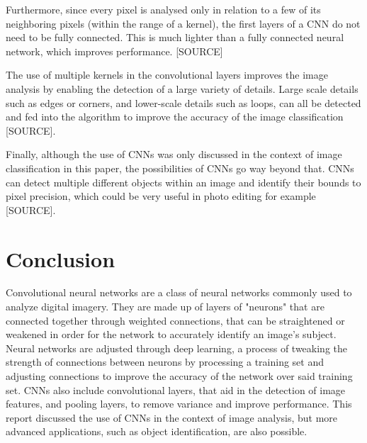 \documentclass[12pt,a4paper,notitlepage]{article}
\begin{document}
Furthermore, since every pixel is analysed only in relation to a few of its neighboring pixels (within the range of a kernel), the first layers of a CNN do not need to be fully connected. This is much lighter than a fully connected neural network, which improves performance. [SOURCE]

The use of multiple kernels in the convolutional layers improves the image analysis by enabling the detection of a large variety of details. Large scale details such as edges or corners, and lower-scale details such as loops, can all be detected and fed into the algorithm to improve the accuracy of the image classification [SOURCE].

Finally, although the use of CNNs was only discussed in the context of image classification in this paper, the possibilities of CNNs go way beyond that. CNNs can detect multiple different objects within an image and identify their bounds to pixel precision, which could be very useful in photo editing for example [SOURCE].

\section{Conclusion}
Convolutional neural networks are a class of neural networks commonly used to analyze digital imagery. They are made up of layers of "neurons" that are connected together through weighted connections, that can be straightened or weakened in order for the network to accurately identify an image's subject. Neural networks are adjusted through deep learning, a process of tweaking the strength of connections between neurons by processing a training set and adjusting connections to improve the accuracy of the network over said training set. CNNs also include convolutional layers, that aid in the detection of image features, and pooling layers, to remove variance and improve performance. This report discussed the use of CNNs in the context of image analysis, but more advanced applications, such as object identification, are also possible.

\clearpage
\begin{flushleft}


\end{flushleft}
\end{document}
